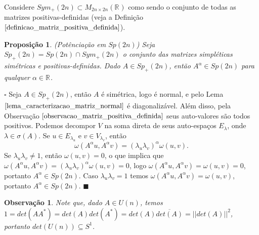 \documentclass[12pt]{book}
\newtheorem{observacao}[teorema]{Observação}
\newtheorem{proposicao}[teorema]{Proposição}
\newenvironment{prova}[1]{$\square$ #1}{\hfill$\blacksquare$}
\newcommand{\espectrooperador}[1]{\sigma(#1)}
\newcommand{\gruposimpletico}[1]{Sp(#1)}
\newcommand{\gruposimpleticopositivo}[1]{Sp_{+}(#1)}
\newcommand{\matrizquadreal}[1]{M_{#1 \times #1}(\real{})}
\newcommand{\matrizsimetricapositiva}[1]{Sym_{+}(#1)}
\newcommand{\matrizunitaria}[1]{U(#1)}
\newcommand{\real}[1]{\mathbb{R}^{#1}}
\begin{document}
	Considere $\matrizsimetricapositiva{2n} \subset \matrizquadreal{2n}$ como sendo o conjunto de todas as matrizes positivas-definidas (veja a Definição $\ref{definicao_matriz_positiva_definida}$).
	
	\begin{proposicao}\label{proposicao_potenciacao_grupo_simpletico}
		(Potênciação em $\gruposimpletico{2n}$) Seja $\gruposimpleticopositivo{2n} = \gruposimpletico{2n} \cap \matrizsimetricapositiva{2n}$ o conjunto das matrizes simpléticas simétricas e positivas-definidas. Dado $A \in \gruposimpleticopositivo{2n}$, então $A^{\alpha} \in \gruposimpletico{2n}$ para qualquer $\alpha \in \real{}$.
	\end{proposicao}
	\begin{prova}
		Seja $A \in \gruposimpleticopositivo{2n}$, então $A$ é simétrica, logo é normal, e pelo Lema $\ref{lema_caracterizacao_matriz_normal}$ é diagonalizável. Além disso, pela Observação $\ref{observacao_matriz_positiva_definida}$ seus auto-valores são todos positivos. Podemos decompor $V$ na soma direta de seus auto-espaços $E_{\lambda}$, onde $\lambda \in \espectrooperador{A}$. Se $u \in E_{\lambda_{u}}$ e $v \in V_{\lambda_{v}}$, então
		$$
		\omega(A^{\alpha}u,A^{\alpha}v) = 		(\lambda_{u}\lambda_{v})^{\alpha}\omega(u,v).
		$$
		Se $\lambda_{u}\lambda_{v}\neq 1$, então $\omega(u,v)=0$, o que implica que $\omega(A^{\alpha}u,A^{\alpha}v)=(\lambda_{u}\lambda_{v})^{\alpha}\omega(u,v)=0$, logo $\omega(A^{\alpha}u,A^{\alpha}v) = \omega(u,v)=0$, portanto $A^{\alpha} \in \gruposimpletico{2n}$. Caso $\lambda_{u}\lambda_{v}=1$ temos $\omega(A^{\alpha}u,A^{\alpha}v) = \omega(u,v)$, portanto $A^{\alpha} \in \gruposimpletico{2n}$.
	\end{prova}
	
	\begin{observacao}\label{observacao_determinante_matriz_unitaria}
		Note que, dado $A \in \matrizunitaria{n}$, temos $1= det(AA^{*}) = det(A)det(A^{*}) = det(A)\overline{det(A)} = ||det(A)||^{2}$, portanto $det(\matrizunitaria{n}) \subseteq S^{1}$.
	\end{observacao}
	
\end{document}
